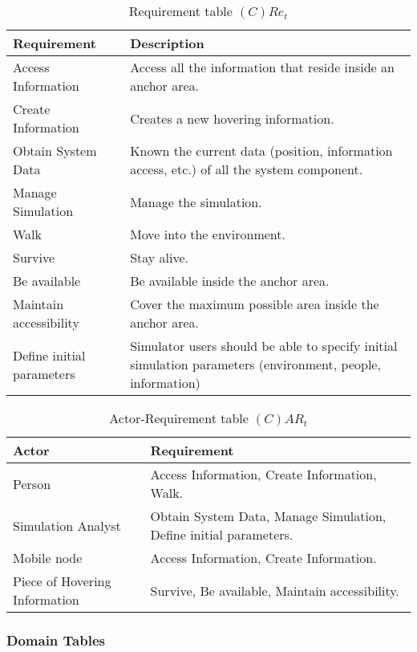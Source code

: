 \begin{table}[H]
	\centering
	\begin{tabular}{|p{4cm}|p{8cm}|}
			\hline
			\textbf{Requirement} & \textbf{Description} \\
			\hline
			Access Information & Access all the information that reside inside an
			anchor area. \\
			\hline
			Create Information & Creates a new hovering information. \\
			\hline
			Obtain System Data & Known the current data (position, information access,
			etc.) of all the system component. \\
			\hline
			Manage Simulation & Manage the simulation. \\
			\hline
			Walk & Move into the environment. \\
			\hline
			Survive & Stay alive. \\
			\hline
			Be available & Be available inside the anchor area. \\
			\hline
			Maintain accessibility & Cover the maximum possible area inside the
			anchor area. \\
			\hline
			Define initial parameters & Simulator users should be able to specify
			initial simulation parameters (environment, people, information) \\
			\hline
		\end{tabular}
	\caption{Requirement table $(C)Re_t$}
	\label{tab:cact}
\end{table}

\begin{table}[H]
	\centering
	\begin{tabular}{|p{4cm}|p{8cm}|}
			\hline
			\textbf{Actor} & \textbf{Requirement} \\
			\hline
			Person & Access Information, Create Information, Walk. \\
			\hline
			Simulation Analyst & Obtain System Data, Manage Simulation, Define
			initial parameters. \\
			\hline
			Mobile node & Access Information, Create Information. \\
			\hline
			Piece of Hovering Information & Survive, Be available, Maintain
			accessibility. \\
			\hline
		\end{tabular}
	\caption{Actor-Requirement table $(C)AR_t$}
	\label{tab:cart}
\end{table}

\subsubsection*{Domain Tables}

